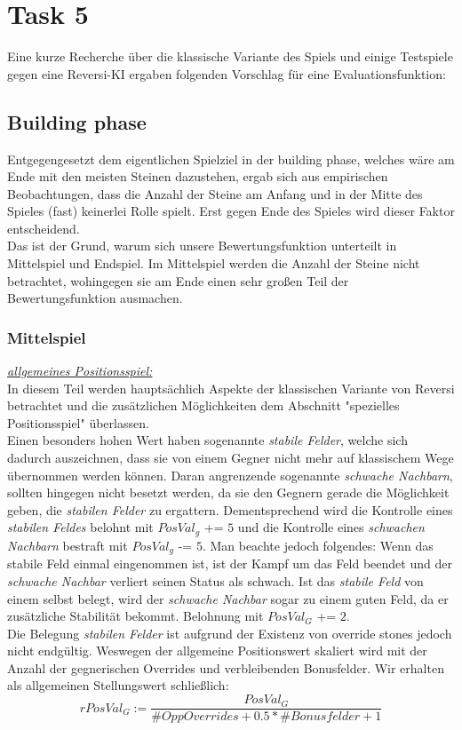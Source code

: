 \section{Task 5}
Eine kurze Recherche über die klassische Variante des Spiels und einige Testspiele gegen eine Reversi-KI ergaben folgenden Vorschlag für eine Evaluationsfunktion:
\subsection{Building phase}
Entgegengesetzt dem eigentlichen Spielziel in der building phase, welches wäre am Ende mit den meisten Steinen dazustehen, ergab sich aus empirischen Beobachtungen, dass die Anzahl der Steine am Anfang und in der Mitte des Spieles (fast) keinerlei Rolle spielt. Erst gegen Ende des Spieles wird dieser Faktor entscheidend.\\
Das ist der Grund, warum sich unsere Bewertungsfunktion unterteilt in Mittelspiel und  Endspiel. Im Mittelspiel werden die Anzahl der Steine nicht betrachtet, wohingegen sie am Ende einen sehr großen Teil der Bewertungsfunktion ausmachen.
\subsubsection{Mittelspiel}
\underline{\textit{allgemeines Positionsspiel:}}\\
In diesem Teil werden hauptsächlich Aspekte der klassischen Variante von Reversi betrachtet und die zusätzlichen Möglichkeiten dem Abschnitt "spezielles Positionsspiel" überlassen.\\
Einen besonders hohen Wert haben sogenannte \textit{stabile Felder}, welche sich dadurch auszeichnen, dass sie von einem Gegner nicht mehr auf klassischem Wege übernommen werden können. Daran angrenzende sogenannte \textit{schwache Nachbarn}, sollten hingegen nicht besetzt werden, da sie den Gegnern gerade die Möglichkeit geben, die \textit{stabilen Felder} zu ergattern. Dementsprechend wird die Kontrolle eines \textit{stabilen Feldes} belohnt mit $PosVal_g$ += $5$ und die Kontrolle eines \textit{schwachen Nachbarn} bestraft mit $PosVal_g$ -= $5$. Man beachte jedoch folgendes: Wenn das stabile Feld einmal eingenommen ist, ist der Kampf um das Feld beendet und der \textit{schwache Nachbar} verliert seinen Status als schwach. Ist das \textit{stabile Feld} von einem selbst belegt, wird der \textit{schwache Nachbar} sogar zu einem guten Feld, da er zusätzliche Stabilität bekommt. Belohnung mit $PosVal_G$ += $2$.\\
Die Belegung \textit{stabilen Felder} ist aufgrund der Existenz von override stones jedoch nicht endgültig. Weswegen der allgemeine Positionswert skaliert wird mit der Anzahl der gegnerischen Overrides und verbleibenden Bonusfelder. Wir erhalten als allgemeinen Stellungswert schließlich:
$$rPosVal_G := \dfrac{PosVal_G}{\#OppOverrides + 0.5*\#Bonusfelder + 1}$$\\

